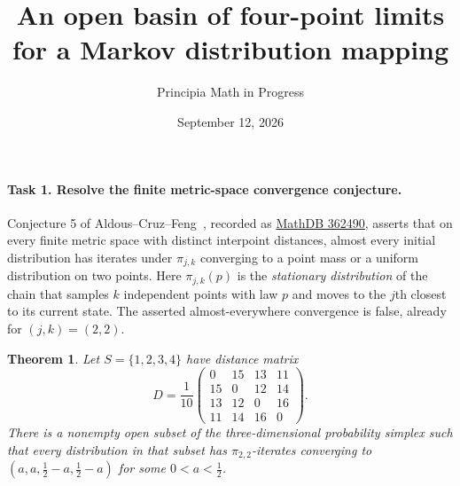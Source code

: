 \documentclass[11pt]{article}
\title{An open basin of four-point limits for a Markov distribution mapping}
\author{Principia Math in Progress}
\date{September 12, 2026}
\newtheorem{theorem}{Theorem}
\begin{document}
\maketitle

\paragraph{Task 1. Resolve the finite metric-space convergence conjecture.}
Conjecture 5 of Aldous--Cruz--Feng~\cite{ACF}, recorded as
\href{https://mathdb.com/p/362490}{MathDB 362490}, asserts that on every finite
metric space with distinct interpoint distances, almost every initial
distribution has iterates under $\pi_{j,k}$ converging to a point mass or a
uniform distribution on two points. Here $\pi_{j,k}(p)$ is the
\emph{stationary distribution} of the chain that samples $k$ independent
points with law $p$ and moves to the $j$th closest to its current state.
The asserted almost-everywhere convergence is false, already for $(j,k)=(2,2)$.

\begin{theorem}
Let $S=\{1,2,3,4\}$ have distance matrix
\[
 D=\frac1{10}\begin{pmatrix}
 0&15&13&11\\15&0&12&14\\13&12&0&16\\11&14&16&0
 \end{pmatrix}.
\]
There is a nonempty open subset of the three-dimensional probability simplex
such that every distribution in that subset has $\pi_{2,2}$-iterates
converging to $(a,a,\tfrac12-a,\tfrac12-a)$ for some $0<a<\tfrac12$.
\end{theorem}
\end{document}
